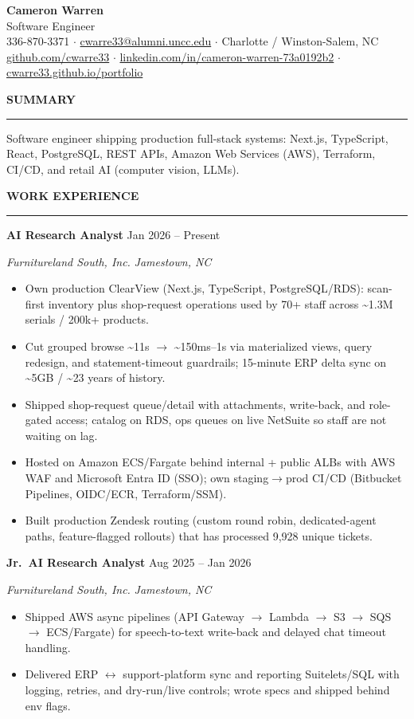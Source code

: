 \documentclass[10pt,letterpaper]{article}
\newcommand{\rsection}[1]{%
  \vspace{5pt}%
  {\normalsize\bfseries\uppercase{#1}}\par\vspace{-0.55em}
  {\color{rulec}\rule{\textwidth}{0.4pt}}\par\vspace{3pt}%
}
\newcommand{\role}[4]{%
  {\bfseries #1} \hfill {\small #4}\par
  {\small\textit{#2}} \hfill {\small\textit{#3}}\par\vspace{1.5pt}%
}
\begin{document}
\color{ink}

\begin{center}
  {\LARGE\bfseries Cameron Warren}\\[1pt]
  {\small Software Engineer}\\[3pt]
  {\footnotesize
    336-870-3371 \;$\cdot$\;
    \href{mailto:cwarre33@alumni.uncc.edu}{cwarre33@alumni.uncc.edu} \;$\cdot$\;
    Charlotte / Winston-Salem, NC}\\[1pt]
  {\footnotesize
    \href{https://github.com/cwarre33}{github.com/cwarre33} \;$\cdot$\;
    \href{https://linkedin.com/in/cameron-warren-73a0192b2}{linkedin.com/in/cameron-warren-73a0192b2} \;$\cdot$\;
    \href{https://cwarre33.github.io/portfolio/}{cwarre33.github.io/portfolio}}
\end{center}

\rsection{Summary}
{\small Software engineer shipping production full-stack systems: Next.js, TypeScript, React, PostgreSQL, REST APIs, Amazon Web Services (AWS), Terraform, CI/CD, and retail AI (computer vision, LLMs).}

\rsection{Work Experience}

\role{AI Research Analyst}{Furnitureland South, Inc.}{Jamestown, NC}{Jan 2026 -- Present}
\begin{itemize}
  \item Own production ClearView (Next.js, TypeScript, PostgreSQL/RDS): scan-first inventory plus shop-request operations used by 70+ staff across {\textasciitilde}1.3M serials / 200k+ products.
  \item Cut grouped browse {\textasciitilde}11s $\rightarrow$ {\textasciitilde}150ms--1s via materialized views, query redesign, and statement-timeout guardrails; 15-minute ERP delta sync on {\textasciitilde}5GB / {\textasciitilde}23 years of history.
  \item Shipped shop-request queue/detail with attachments, write-back, and role-gated access; catalog on RDS, ops queues on live NetSuite so staff are not waiting on lag.
  \item Hosted on Amazon ECS/Fargate behind internal + public ALBs with AWS WAF and Microsoft Entra ID (SSO); own staging$\rightarrow$prod CI/CD (Bitbucket Pipelines, OIDC/ECR, Terraform/SSM).
  \item Built production Zendesk routing (custom round robin, dedicated-agent paths, feature-flagged rollouts) that has processed 9,928 unique tickets.
\end{itemize}

\vspace{3pt}
\role{Jr.\ AI Research Analyst}{Furnitureland South, Inc.}{Jamestown, NC}{Aug 2025 -- Jan 2026}
\begin{itemize}
  \item Shipped AWS async pipelines (API Gateway $\rightarrow$ Lambda $\rightarrow$ S3 $\rightarrow$ SQS $\rightarrow$ ECS/Fargate) for speech-to-text write-back and delayed chat timeout handling.
  \item Delivered ERP $\leftrightarrow$ support-platform sync and reporting Suitelets/SQL with logging, retries, and dry-run/live controls; wrote specs and shipped behind env flags.
\end{itemize}
\end{document}
